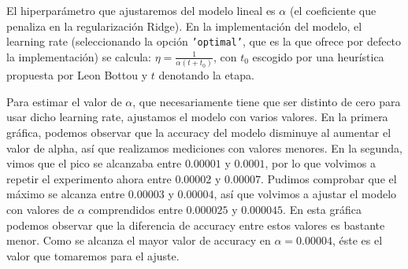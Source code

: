 \documentclass[a4]{article}
\begin{document}
El hiperparámetro que ajustaremos del modelo lineal es $\alpha$ (el
coeficiente que penaliza en la regularización Ridge). En la
implementación del modelo, el learning rate (seleccionando la opción
\texttt{'optimal'}, que es la que ofrece por defecto la
implementación) se calcula: $\eta = \frac{1}{\alpha (t + t_0)}$, con
$t_0$ escogido por una heurística propuesta por Leon Bottou y $t$
denotando la etapa.

Para estimar el valor de $\alpha$, que necesariamente tiene que ser
distinto de cero para usar dicho learning rate, ajustamos el modelo
con varios valores. En la primera gráfica, podemos observar que la
accuracy del modelo disminuye al aumentar el valor de alpha, así que
realizamos mediciones con valores menores. En la segunda, vimos que el
pico se alcanzaba entre $0.00001$ y $0.0001$, por lo que volvimos a
repetir el experimento ahora entre $0.00002$ y $0.00007$. Pudimos
comprobar que el máximo se alcanza entre $0.00003$ y $0.00004$, así
que volvimos a ajustar el modelo con valores de $\alpha$ comprendidos
entre $0.000025$ y $0.000045$. En esta gráfica podemos observar que la
diferencia de accuracy entre estos valores es bastante menor. Como se
alcanza el mayor valor de accuracy en $\alpha = 0.00004$, éste es el
valor que tomaremos para el ajuste.
\end{document}
